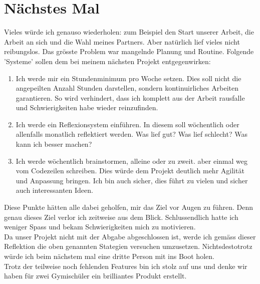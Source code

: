 \section{Nächstes Mal}
Vieles würde ich genauso wiederholen:
zum Beispiel den Start unserer Arbeit, die Arbeit an sich und die Wahl meines Partners.
Aber natürlich lief vieles nicht reibungslos.
Das grösste Problem war mangelnde Planung und Routine.
Folgende 'Systeme' sollen dem bei meinem nächsten Projekt entgegenwirken:
\begin{enumerate}
    \item Ich werde mir ein Stundenminimum pro Woche setzen.
    Dies soll nicht die angepeilten Anzahl Stunden darstellen, sondern kontinuirliches Arbeiten garantieren.
    So wird verhindert, dass ich komplett aus der Arbeit rausfalle und Schwierigkeiten habe wieder reinzufinden.
    \item Ich werde ein Reflexionsystem einführen.
    In diesem soll wöchentlich oder allenfalls monatlich reflektiert werden.
    Was lief gut? Was lief schlecht? Was kann ich besser machen?
    \item Ich werde wöchentlich brainstormen, alleine oder zu zweit. 
    aber einmal weg vom Codezeilen schreiben.
    Dies würde dem Projekt deutlich mehr Agilität und Anpassung bringen.
    Ich bin auch sicher, dies führt zu vielen und sicher auch interessanten Ideen.
\end{enumerate}
Diese Punkte hätten alle dabei geholfen, mir das Ziel vor Augen zu führen.
Denn genau dieses Ziel verlor ich zeitweise aus dem Blick.
Schlussendlich hatte ich weniger Spass und bekam Schwierigkeiten mich zu motivieren. \\
Da unser Projekt nicht mit der Abgabe abgeschlossen ist, werde ich gemäss dieser Reflektion die oben genannten Stategien versuchen umzusetzen. 
Nichtsdestotrotz würde ich beim nächstem mal eine dritte Person mit ins Boot holen.\\
Trotz der teilweise noch fehlenden Features bin ich stolz auf uns und denke wir haben für zwei Gymischüler ein brilliantes Produkt erstellt.